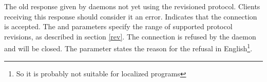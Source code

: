 \documentclass[twoside,a4paper,11pt]{article}
\begin{document}

\noperm

\begin{responses}
  The old response given by daemons not yet using the revisioned
  protocol. Clients receiving this response should consider it an
  error.
  Indicates that the connection is accepted. The  and
   parameters specify the range of supported protocol
  revisions, as described in section \ref{rev}.
  The connection is refused by the daemon and will be closed. The
   parameter states the reason for the refusal in
  English\footnote{So it is probably not suitable for localized
    programs}.
\end{responses}
\end{document}
